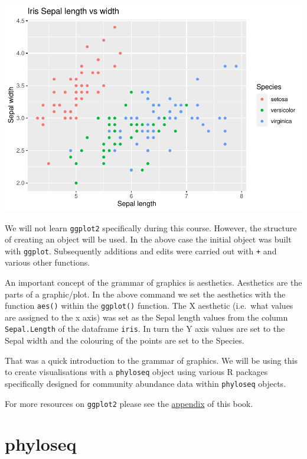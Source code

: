 \documentclass[
]{book}
\begin{document}
\begin{center}\includegraphics{R-community-analysis_files/figure-latex/f-1} \end{center}

We will not learn \texttt{ggplot2} specifically during this course. However, the structure of creating an object will be used. In the above case the initial object was built with \texttt{ggplot}. Subsequently additions and edits were carried out with \texttt{+} and various other functions.

An important concept of the grammar of graphics is aesthetics. Aesthetics are the parts of a graphic/plot. In the above command we set the aesthetics with the function \texttt{aes()} within the \texttt{ggplot()} function. The X aesthetic (i.e.~what values are assigned to the x axis) was set as the Sepal length values from the column \texttt{Sepal.Length} of the dataframe \texttt{iris}. In turn the Y axis values are set to the Sepal width and the colouring of the points are set to the Species.

That was a quick introduction to the grammar of graphics. We will be using this to create visualisations with a \texttt{phyloseq} object using various R packages specifically designed for community abundance data within \texttt{phyloseq} objects.

For more resources on \texttt{ggplot2} please see the \protect\hyperlink{ggplot2_appendix}{appendix} of this book.

\hypertarget{phyloseq}{%
\section{phyloseq}\label{phyloseq}}
\end{document}
